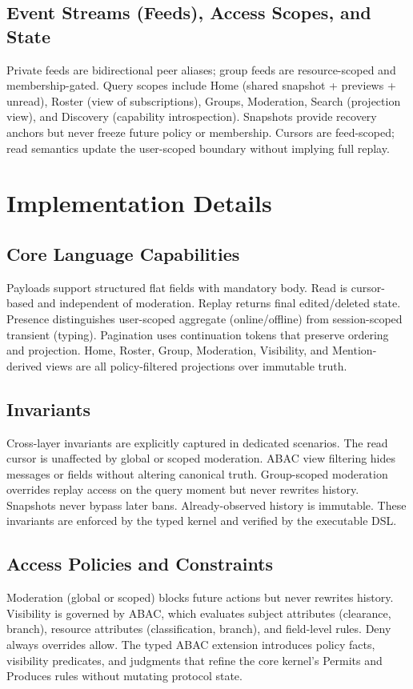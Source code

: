 \documentclass{article}
\begin{document}
\subsection{Event Streams (Feeds), Access Scopes, and State}

Private feeds are bidirectional peer aliases; group feeds are resource-scoped and membership-gated.
Query scopes include Home (shared snapshot + previews + unread), Roster (view of subscriptions), Groups,
Moderation, Search (projection view), and Discovery (capability introspection).
Snapshots provide recovery anchors but never freeze future policy or membership.
Cursors are feed-scoped; read semantics update the user-scoped boundary without implying full replay.

\section{Implementation Details}

\subsection{Core Language Capabilities}
Payloads support structured flat fields with mandatory body.
Read is cursor-based and independent of moderation. Replay returns final edited/deleted state.
Presence distinguishes user-scoped aggregate (online/offline) from session-scoped transient (typing).
Pagination uses continuation tokens that preserve ordering and projection.
Home, Roster, Group, Moderation, Visibility, and Mention-derived views are all policy-filtered projections over immutable truth.

\subsection{Invariants}
Cross-layer invariants are explicitly captured in dedicated scenarios.
The read cursor is unaffected by global or scoped moderation.
ABAC view filtering hides messages or fields without altering canonical truth.
Group-scoped moderation overrides replay access on the query moment but never rewrites history.
Snapshots never bypass later bans. Already-observed history is immutable.
These invariants are enforced by the typed kernel and verified by the executable DSL.

\subsection{Access Policies and Constraints}
Moderation (global or scoped) blocks future actions but never rewrites history.
Visibility is governed by ABAC, which evaluates subject attributes (clearance, branch),
resource attributes (classification, branch), and field-level rules. Deny always overrides allow.
The typed ABAC extension introduces policy facts, visibility predicates, and judgments that refine the core kernel's
Permits and Produces rules without mutating protocol state.
\end{document}
